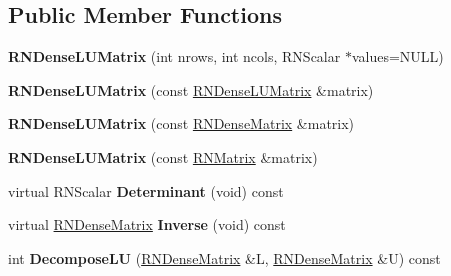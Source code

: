\subsection*{Public Member Functions}
\begin{DoxyCompactItemize}
\item 
{\bfseries R\+N\+Dense\+L\+U\+Matrix} (int nrows, int ncols, R\+N\+Scalar $\ast$values=N\+U\+LL)\hypertarget{class_r_n_dense_l_u_matrix_a8d4daa21d293d1acf454429285cfb095}{}\label{class_r_n_dense_l_u_matrix_a8d4daa21d293d1acf454429285cfb095}

\item 
{\bfseries R\+N\+Dense\+L\+U\+Matrix} (const \hyperlink{class_r_n_dense_l_u_matrix}{R\+N\+Dense\+L\+U\+Matrix} \&matrix)\hypertarget{class_r_n_dense_l_u_matrix_a294502a125076261e78c21d4916d1545}{}\label{class_r_n_dense_l_u_matrix_a294502a125076261e78c21d4916d1545}

\item 
{\bfseries R\+N\+Dense\+L\+U\+Matrix} (const \hyperlink{class_r_n_dense_matrix}{R\+N\+Dense\+Matrix} \&matrix)\hypertarget{class_r_n_dense_l_u_matrix_a20d59008db3a676e60efc6fdcad85bb7}{}\label{class_r_n_dense_l_u_matrix_a20d59008db3a676e60efc6fdcad85bb7}

\item 
{\bfseries R\+N\+Dense\+L\+U\+Matrix} (const \hyperlink{class_r_n_matrix}{R\+N\+Matrix} \&matrix)\hypertarget{class_r_n_dense_l_u_matrix_a5905c40d9bb0eee2eefeb8c932cccc12}{}\label{class_r_n_dense_l_u_matrix_a5905c40d9bb0eee2eefeb8c932cccc12}

\item 
virtual R\+N\+Scalar {\bfseries Determinant} (void) const \hypertarget{class_r_n_dense_l_u_matrix_a69650d2a8c07f47b7448edc44ae3d98a}{}\label{class_r_n_dense_l_u_matrix_a69650d2a8c07f47b7448edc44ae3d98a}

\item 
virtual \hyperlink{class_r_n_dense_matrix}{R\+N\+Dense\+Matrix} {\bfseries Inverse} (void) const \hypertarget{class_r_n_dense_l_u_matrix_a2f7eed511e8cbe1373afd1c8f31ac4c8}{}\label{class_r_n_dense_l_u_matrix_a2f7eed511e8cbe1373afd1c8f31ac4c8}

\item 
int {\bfseries Decompose\+LU} (\hyperlink{class_r_n_dense_matrix}{R\+N\+Dense\+Matrix} \&L, \hyperlink{class_r_n_dense_matrix}{R\+N\+Dense\+Matrix} \&U) const \hypertarget{class_r_n_dense_l_u_matrix_ac29dae9778f3c2270fb78a835349d82e}{}\label{class_r_n_dense_l_u_matrix_ac29dae9778f3c2270fb78a835349d82e}

\end{DoxyCompactItemize}

